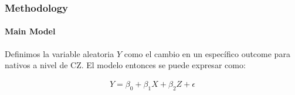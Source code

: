 
\begin{frame}
    \frametitle{Methodology}
    \framesubtitle{Main Model}

    Definimos la variable aleatoria $Y$ como el cambio en un específico outcome para nativos a nivel de CZ. El modelo entonces se puede expresar como:

    \begin{align*}
        Y = \beta_0 + \beta_1 X + \beta_2 Z + \epsilon
    \end{align*}
    
\end{frame}